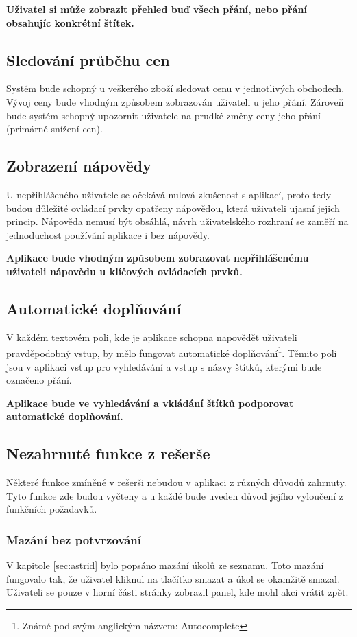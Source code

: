 \textbf{Uživatel si může zobrazit přehled buď všech přání, nebo přání obsahujíc konkrétní štítek.}

\subsection{Sledování průběhu cen}
Systém bude schopný u veškerého zboží sledovat cenu v jednotlivých obchodech. Vývoj ceny bude vhodným způsobem zobrazován uživateli u jeho přání. Zároveň bude systém schopný upozornit uživatele na prudké změny ceny jeho přání (primárně snížení cen).

\subsection{Zobrazení nápovědy}
U nepřihlášeného uživatele se očekává nulová zkušenost s aplikací, proto tedy budou důležité ovládací prvky opatřeny nápovědou, která uživateli ujasní jejich princip. Nápověda nemusí být obsáhlá, návrh uživatelského rozhraní se zaměří na jednoduchost používání aplikace i bez nápovědy.

\textbf{Aplikace bude vhodným způsobem zobrazovat nepřihlášenému uživateli nápovědu u klíčových ovládacích prvků.}

\subsection{Automatické doplňování}
V každém textovém poli, kde je aplikace schopna napovědět uživateli pravděpodobný vstup, by mělo fungovat automatické doplňování\footnote{Známé pod svým anglickým názvem: Autocomplete}. Těmito poli jsou v aplikaci vstup pro vyhledávání a vstup s názvy štítků, kterými bude označeno přání.

\textbf{Aplikace bude ve vyhledávání a vkládání štítků podporovat automatické doplňování.}

\subsection{Nezahrnuté funkce z rešerše}
Některé funkce zmíněné v rešerši nebudou v aplikaci z různých důvodů zahrnuty. Tyto funkce zde budou vyčteny a u každé bude uveden důvod jejího vyloučení z funkčních požadavků.

\subsubsection{Mazání bez potvrzování}
V kapitole \ref{sec:astrid} bylo popsáno mazání úkolů ze seznamu. Toto mazání fungovalo tak, že uživatel kliknul na tlačítko smazat a úkol se okamžitě smazal. Uživateli se pouze v horní části stránky zobrazil panel, kde mohl akci vrátit zpět.

